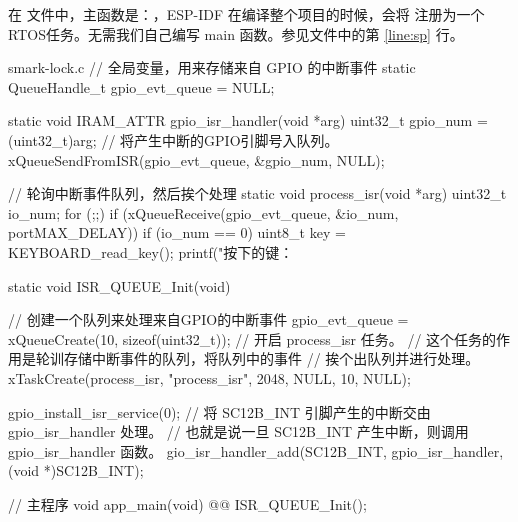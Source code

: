 \documentclass[lang=cn,newtx,10pt,scheme=chinese]{elegantbook}
\begin{document}
在  文件中，主函数是：，ESP-IDF 在编译整个项目的时候，会将  注册为一个RTOS任务。无需我们自己编写 main 函数。参见文件中的第 \ref{line:sp} 行。

\begin{mycode}{smark-lock.c}
// 全局变量，用来存储来自 GPIO 的中断事件
static QueueHandle_t gpio_evt_queue = NULL;

static void IRAM_ATTR gpio_isr_handler(void *arg)
{
  uint32_t gpio_num = (uint32_t)arg;
  // 将产生中断的GPIO引脚号入队列。
  xQueueSendFromISR(gpio_evt_queue, &gpio_num, NULL);
}

// 轮询中断事件队列，然后挨个处理
static void process_isr(void *arg)
{
  uint32_t io_num;
  for (;;)
  {
    if (xQueueReceive(gpio_evt_queue, &io_num, portMAX_DELAY))
    {
      if (io_num == 0)
      {
        uint8_t key = KEYBOARD_read_key();
        printf("按下的键：%
      }
    }
  }
}

static void ISR_QUEUE_Init(void)
{
  // 创建一个队列来处理来自GPIO的中断事件
  gpio_evt_queue = xQueueCreate(10, sizeof(uint32_t));
  // 开启 process_isr 任务。
  // 这个任务的作用是轮训存储中断事件的队列，将队列中的事件
  // 挨个出队列并进行处理。
  xTaskCreate(process_isr, "process_isr", 2048, NULL, 10, NULL);

  gpio_install_isr_service(0);
  // 将 SC12B_INT 引脚产生的中断交由 gpio_isr_handler 处理。
  // 也就是说一旦 SC12B_INT 产生中断，则调用 gpio_isr_handler 函数。
  gio_isr_handler_add(SC12B_INT, gpio_isr_handler, (void *)SC12B_INT);
}

// 主程序
void app_main(void) @\label{line:sp}@
{
  ISR_QUEUE_Init();
}
\end{mycode}
\end{document}
